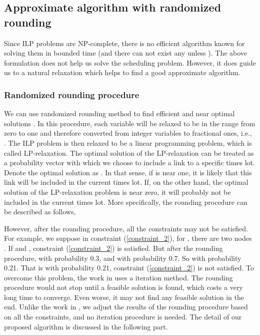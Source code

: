\documentclass[conference]{IEEEtran}
\begin{document}
\subsection{Approximate algorithm with randomized rounding}

Since ILP problems are NP-complete, there is no efficient algorithm
known for solving them in bounded time (and there can not exist any
unless ). The above formulation does not help us solve the
scheduling problem. However, it does guide us to a natural
relaxation which helps to find a good approximate algorithm.
\subsubsection{Randomized rounding procedure}

We can use randomized rounding method to find efficient and near
optimal solutions \cite{raghavan1987rrt}. In this procedure, each
variable  will be relaxed to be in the range from zero to
one and therefore converted from integer variables to fractional
ones, i.e., . The ILP problem is then relaxed to be a linear
programming problem, which is called LP-relaxation. The optimal
solution of the LP-relaxation can be treated as a probability vector
with which we choose to include a link to a specific times lot.
Denote the optimal solution as . In that sense, if
 is near one, it is likely that this link will be
included in the current times lot. If, on the other hand, the
optimal solution of the LP-relaxation problem is near zero, it will
probably not be included in the current times lot. More
specifically, the rounding procedure can be described as follows,


However, after the rounding procedure, all the constraints may not
be satisfied. For example, we suppose in constraint
(\ref{constraint_2}), for , there are
two nodes . If  and
, constraint (\ref{constraint_2}) is
satisfied. But after the rounding procedure,  with
probability 0.3, and  with probability 0.7. So
 with probability 0.21. That is with
probability 0.21, constraint (\ref{constraint_2}) is not satisfied.
To overcome this problem, the work in \cite{friderikos2006non} uses
a iteration method. The rounding procedure would not stop until a
feasible solution is found, which costs a very long time to
converge. Even worse, it may not find any feasible solution in the
end. Unlike the work in \cite{friderikos2006non}, we adjust the
results of the rounding procedure based on all the constraints, and
no iteration procedure is needed. The detail of our proposed
algorithm is discussed in the following part.
\end{document}
